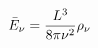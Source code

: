 \documentclass[preview]{standalone}
\begin{document}
\begin{align*}
\bar{E}_{\nu}= { L ^{3}  \over 8\pi\nu^{2} } \rho_{\nu}
\end{align*}
\end{document}

